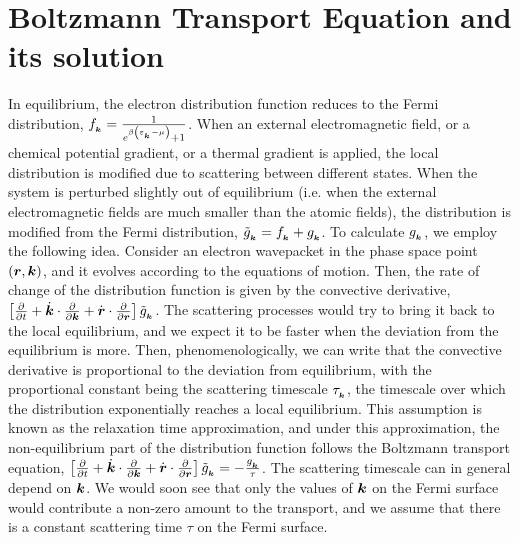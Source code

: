 \documentclass{report}
\renewcommand\vec[1]{\ensuremath\boldsymbol{#1}} %
\begin{document}
\chapter{Boltzmann Transport Equation and its solution}\label{sec:BTE-and-solution}
In equilibrium, the electron distribution function reduces to the Fermi distribution, $f_{_{\vec{k}}} = \frac{1}{e^{\beta \left(\varepsilon_{_{\vec{k}}} - \mu \right)} + 1}$. When an external electromagnetic field, or a chemical potential gradient, or a thermal gradient is applied, the local distribution is modified due to scattering between different states. When the system is perturbed slightly out of equilibrium (i.e. when the external electromagnetic fields are much smaller than the atomic fields), the distribution is modified from the Fermi distribution, $\tilde{g}_{_{\vec{k}}} = f_{_{\vec{k}}} + g_{_{\vec{k}}}$. To calculate $g_{_{\vec{k}}}$, we employ the following idea. Consider an electron wavepacket in the phase space point $(\vec{r},\vec{k})$, and it evolves according to the equations of motion. Then, the rate of change of the distribution function is given by the convective derivative, $\left[\frac{\partial}{\partial t} +  \dot{\vec{k}}\cdot\frac{\partial}{\partial \vec{k}} + \dot{\vec{r}}\cdot\frac{\partial}{\partial \vec{r}} \right]\tilde{g}_{_{\vec{k}}}$. The scattering processes would try to bring it back to the local equilibrium, and we expect it to be faster when the deviation from the equilibrium is more. Then, phenomenologically, we can write that the convective derivative is proportional to the deviation from equilibrium, with the proportional constant being the scattering timescale $\tau_{_{\vec{k}}}$, the timescale over which the distribution exponentially reaches a local equilibrium. This assumption is known as the relaxation time approximation, and under this approximation, the non-equilibrium part of the distribution function follows the Boltzmann transport equation, $\left[\frac{\partial}{\partial t} +  \dot{\vec{k}}\cdot\frac{\partial}{\partial \vec{k}} + \dot{\vec{r}}\cdot\frac{\partial}{\partial \vec{r}} \right]\tilde{g}_{_{\vec{k}}} = -\frac{g_{_{\vec{k}}}}{\tau}$. The scattering timescale can in general depend on $\vec{k}$. We would soon see that only the values of $\vec{k}$ on the Fermi surface would contribute a non-zero amount to the transport, and we assume that there is a constant scattering time $\tau$ on the Fermi surface. 
\end{document}
